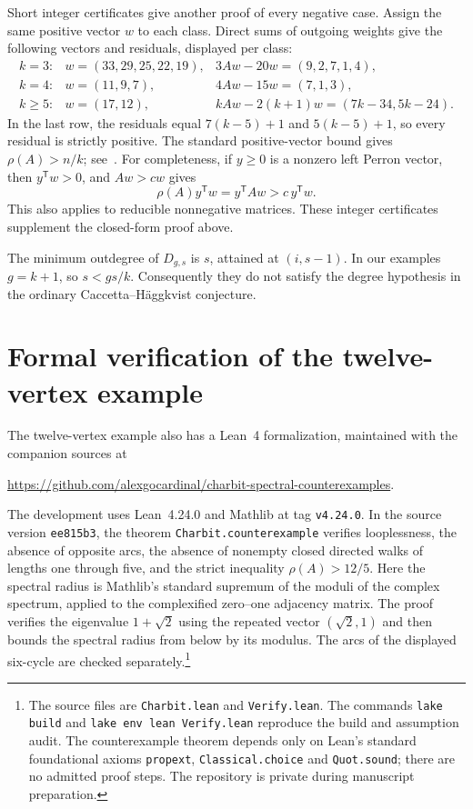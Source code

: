 \documentclass[11pt]{article}
\begin{document}
Short integer certificates give another proof of every negative case. Assign the same positive vector $w$ to each class. Direct sums of outgoing weights give the following vectors and residuals, displayed per class:
\[
\begin{array}{ccl}
k=3:&w=(33,29,25,22,19),&3Aw-20w=(9,2,7,1,4),\\[2pt]
k=4:&w=(11,9,7),&4Aw-15w=(7,1,3),\\[2pt]
k\geq5:&w=(17,12),&kAw-2(k+1)w=(7k-34,5k-24).
\end{array}
\]
In the last row, the residuals equal $7(k-5)+1$ and $5(k-5)+1$, so every residual is strictly positive. The standard positive-vector bound gives $\rho(A)>n/k$; see~\cite[Theorem~1.2]{butler}. For completeness, if $y\geq0$ is a nonzero left Perron vector, then $y^{\mathsf T}w>0$, and $Aw>cw$ gives
\[
 \rho(A)y^{\mathsf T}w=y^{\mathsf T}Aw>c\,y^{\mathsf T}w.
\]
This also applies to reducible nonnegative matrices. These integer certificates supplement the closed-form proof above.

The minimum outdegree of $D_{g,s}$ is $s$, attained at $(i,s-1)$. In our examples $g=k+1$, so $s<gs/k$. Consequently they do not satisfy the degree hypothesis in the ordinary Caccetta--H\"aggkvist conjecture.

\section{Formal verification of the twelve-vertex example}

The twelve-vertex example also has a Lean~4 formalization, maintained with the companion sources at
\begin{center}
\url{https://github.com/alexgocardinal/charbit-spectral-counterexamples}.
\end{center}
The development uses Lean~4.24.0 and Mathlib at tag \texttt{v4.24.0}. In the source version \texttt{ee815b3}, the theorem \texttt{Charbit.counterexample} verifies looplessness, the absence of opposite arcs, the absence of nonempty closed directed walks of lengths one through five, and the strict inequality $\rho(A)>12/5$. Here the spectral radius is Mathlib's standard supremum of the moduli of the complex spectrum, applied to the complexified zero--one adjacency matrix. The proof verifies the eigenvalue $1+\sqrt2$ using the repeated vector $(\sqrt2,1)$ and then bounds the spectral radius from below by its modulus. The arcs of the displayed six-cycle are checked separately.\footnote{The source files are \texttt{Charbit.lean} and \texttt{Verify.lean}. The commands \texttt{lake build} and \texttt{lake env lean Verify.lean} reproduce the build and assumption audit. The counterexample theorem depends only on Lean's standard foundational axioms \texttt{propext}, \texttt{Classical.choice} and \texttt{Quot.sound}; there are no admitted proof steps. The repository is private during manuscript preparation.}
\end{document}
